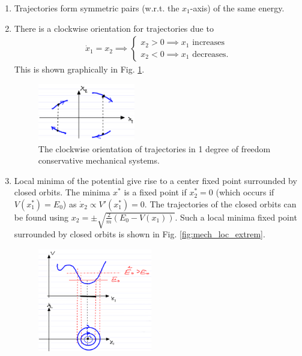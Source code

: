 \begin{enumerate}
	\item Trajectories form symmetric pairs (w.r.t. the $x_1$-axis) of the same energy.
	\item There is a clockwise orientation for trajectories due to 
		\begin{align}
			\dot{x}_1 = x_2 \implies
			\begin{cases}
				x_2>0 \implies x_1  \textrm{ increases} \\
				x_2 <0 \implies x_1  \textrm{ decreases} .
			\end{cases}
		\end{align}
		This is shown graphically in Fig. \ref{fig:mech_clock_orient}.
		\begin{figure}[h!]
			\centering
			\includegraphics[width=0.4\textwidth]{figures/ch4/1mech_clock_orient.png}
			\caption{The clockwise orientation of trajectories in 1 degree of freedom conservative mechanical systems.}
			\label{fig:mech_clock_orient}
		\end{figure}
	\item Local minima of the potential give rise to a center fixed point surrounded by closed orbits. The minima $x^{*} $ is a fixed point if $x^{*}_2 = 0$ (which occurs if $V(x^*_1) = E_0$) as $\dot{x}_2 \propto V'(x^{*}_1) = 0 $. The trajectories of the closed orbits can be found using $x_2 = \pm \sqrt{\frac{2}{m}(E_0 - V(x_1))}$. Such a local minima fixed point surrounded by closed orbits is shown in Fig. \ref{fig:mech_loc_extrem}.
\begin{figure}[h!]
	\centering
	\includegraphics[width=0.47\textwidth]{figures/ch4/2mech_orbits_minima.png}

\end{figure}
\end{enumerate}
